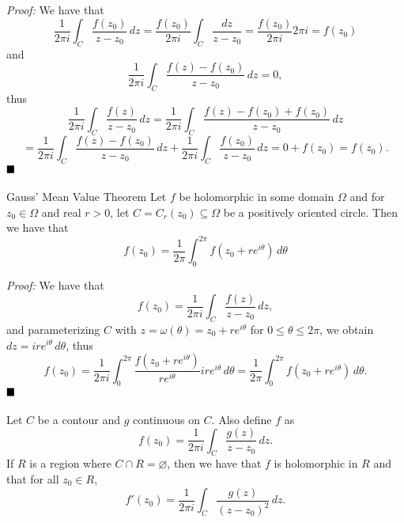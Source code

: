 \documentclass[12pt]{article}
\newcommand{\proof}{\textit{Proof: }}
\newcommand{\done}{\ensuremath{\strut\hfill\blacksquare}}
\begin{document}
\proof
We have that
\[
	\frac{1}{2\pi i} \int_C \frac{f(z_0)}{z - z_0} \, dz
	= \frac{f(z_0)}{2\pi i} \int_C \frac{dz}{z - z_0}
	= \frac{f(z_0)}{2\pi i} 2\pi i
	= f(z_0)
\]
and
\[
	\frac{1}{2\pi i} \int_C \frac{f(z) - f(z_0)}{z - z_0} \, dz = 0,
\]
thus
\[
	\frac{1}{2\pi i} \int_C \frac{f(z)}{z - z_0} \, dz
	= \frac{1}{2\pi i} \int_C \frac{f(z) - f(z_0) + f(z_0)}{z - z_0} \, dz
\]
\[
	= \frac{1}{2\pi i} \int_C \frac{f(z) - f(z_0)}{z - z_0} \, dz
	+ \frac{1}{2\pi i} \int_C \frac{f(z_0)}{z - z_0} \, dz
	= 0 + f(z_0) = f(z_0).
\]
\done

\begin{corollary}{Gauss' Mean Value Theorem}{}
	Let \( f \) be holomorphic in some domain \( \Omega \) and for
	\( z_0 \in \Omega \) and real \( r > 0 \), let
	\( C = C_r(z_0) \subseteq \Omega \) be a positively oriented circle.
	Then we have that
	\[
		f(z_0)
		= \frac{1}{2\pi} \int_0^{2\pi} f(z_0 + re^{i\theta}) \, d\theta
	\]
\end{corollary}

\proof
We have that
\[
	f(z_0)
	= \frac{1}{2\pi i} \int_C \frac{f(z)}{z - z_0} \, dz,
\]
and parameterizing \( C \) with \( z = \omega(\theta) = z_0 + re^{i\theta} \)
for
\( 0 \leq \theta \leq 2\pi \), we obtain \( dz = ire^{i\theta} \, d\theta \),
thus
\[
	f(z_0)
	= \frac{1}{2\pi i} \int_0^{2\pi} \frac{f(z_0 + re^{i\theta})}{re^{i\theta}}
	ire^{i\theta} \, d\theta
	= \frac{1}{2\pi} \int_0^{2\pi} f(z_0 + re^{i\theta}) \, d\theta.
\]
\done

\begin{lemma}{}{}
	Let \( C \) be a contour and \( g \) continuous on \( C \).
	Also define \( f \) as
	\[
		f(z_0)
		= \frac{1}{2\pi i} \int_C \frac{g(z)}{z - z_0} \, dz.
	\]
	If \( R \) is a region where \( C \cap R = \varnothing \), then we have
	that \( f \) is holomorphic in \( R \) and that for all \( z_0 \in R \),
	\[
		f'(z_0) = \frac{1}{2\pi i} \int_C \frac{g(z)}{(z - z_0)^2} \, dz.
	\]
\end{lemma}
\end{document}
